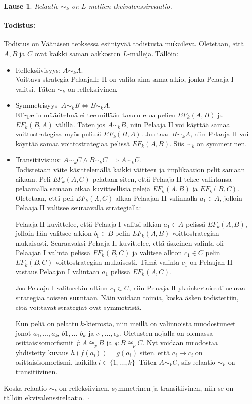 \documentclass[finnish]{tktltiki2}
\newtheorem{lau}{Lause}
\theoremstyle{definition}
\theoremstyle{remark}
\newenvironment{tod}{\paragraph{Todistus:}}{\hfill$\square$}
\begin{document}
\begin{lau} 
Relaatio $\sim_k$ on $L$-mallien ekvivalenssirelaatio.
\end{lau}
\begin{tod} Todistus on Väänäsen teoksessa \cite{Vaa11} esiintyvää todistusta mukaileva. Oletetaan, että $A, B$ ja $C$ ovat kaikki saman aakkoston $L$-malleja. Tällöin:
\begin{itemize}
\item Refleksiivisyys: $A \sim_k A$.\\
Voittava strategia Pelaajalle II on valita aina sama alkio, jonka Pelaaja I valitsi. Täten $\sim_k$ on refleksiivinen.
\item Symmetrisyys: $A \sim_k B \iff B \sim_k A$.\\
EF-pelin määritelmä ei tee millään tavoin eroa pelien $EF_k(A, B)$ ja $EF_k(B, A)$ välillä. Täten jos $A \sim_k B$, niin Pelaaja II voi käyttää samaa voittostrategiaa myös pelissä $EF_k(B, A)$. Jos taas $B \sim_k A$, niin Pelaaja II voi käyttää samaa voittostrategiaa pelissä $EF_k(A, B)$. Siis $\sim_k$ on symmetrinen.
\item Transitiivisuus: $A \sim_k C \land B \sim_k C \implies A \sim_k C$.\\
Todistetaan väite käsittelemällä kaikki väitteen ja implikaation pelit samaan aikaan. Peli $EF_k(A, C)$ pelataan siten, että Pelaaja II tekee valintansa pelaamalla samaan aikaa kuvitteellisia pelejä $EF_k(A, B)$ ja $EF_k(B, C)$. Oletetaan, että peli $EF_k(A, C)$ alkaa Pelaajan II valinnalla $a_1 \in A$, jolloin Pelaaja II valitsee seuraavalla strategialla:

Pelaaja II kuvittelee, että Pelaaja I valitsi alkion $a_1 \in A$ pelissä $EF_k(A, B)$, jolloin hän valitsee alkion $b_1 \in B$ pelin $EF_k(A, B)$ voittostrategian mukaisesti. Seuraavaksi Pelaaja II kuvittelee, että äskeinen valinta oli Pelaajan I valinta pelissä $EF_k(B, C)$ ja valitsee alkion $c_1 \in C$ pelin $EF_k(B, C)$ voittostrategian mukaisesti. Tämä valinta $c_1$ on Pelaajan II vastaus Pelaajan I valintaan $a_1$ pelissä $EF_k(A, C)$.

Jos Pelaaja I valitseekin alkion $c_1 \in C$, niin Pelaaja II yksinkertaisesti seuraa strategiaa toiseen suuntaan. Näin voidaan toimia, koska äsken todistettiin, että voittavat strategiat ovat symmetrisiä.

Kun peliä on pelattu $k$-kierrosta, niin meillä on valinnoista muodostuneet jonot $a_1, \ldots, a_k$, $b1, \ldots, b_k$ ja $c_1, \ldots, c_k$. Oletusten nojalla on olemassa osittaisisomorfismit $f: A \cong_p B$ ja $g: B \cong_p C$. Nyt voidaan muodostaa yhdistetty kuvaus $h(f(a_i)) = g(a_i)$ siten, että $a_i \mapsto c_i$ on osittaisisomorfismi, kaikilla $i \in \{1, \ldots, k\}$. Täten $A \sim_k C$, siis relaatio $\sim_k$ on transitiivinen.
\end{itemize}
Koska relaatio $\sim_k$ on refleksiivinen, symmetrinen ja transitiivinen, niin se on tällöin ekvivalenssirelaatio.
\end{tod}
\\
\end{document}
